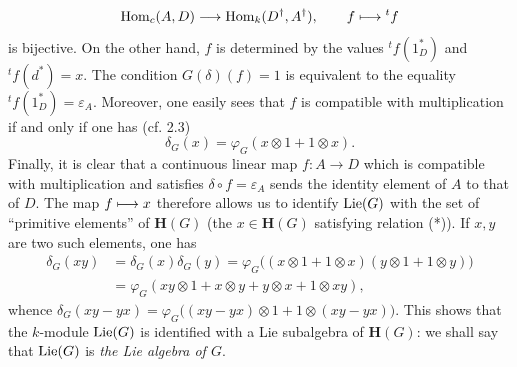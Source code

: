 \begin{enumeratea}
\[
\operatorname{Hom}_c(A,D)\longrightarrow\operatorname{Hom}_k(D^\dagger,A^\dagger),\qquad f\longmapsto{}^t f
\]
is bijective. On the other hand, $f$ is determined by the values ${}^t f(1_D^*)$ and ${}^t f(d^*)=x$. The condition $G(\delta)(f)=1$ is equivalent to the equality ${}^t f(1_D^*)=\varepsilon_A$. Moreover, one easily sees that $f$ is compatible with multiplication if and only if one has (cf. 2.3)
\begin{equation}\tag{*}
\delta_G(x)=\varphi_G(x\otimes1+1\otimes x).
\end{equation}
Finally, it is clear that a continuous linear map $f:A\to D$ which is compatible with multiplication and satisfies $\delta\circ f=\varepsilon_A$ sends the identity element of $A$ to that of $D$. The map $f\longmapsto x$ therefore allows us to identify $\operatorname{Lie}(G)$ with the set of ``primitive elements'' of $\mathbf H(G)$ (\ie the $x\in\mathbf H(G)$ satisfying relation (*)). If $x,y$ are two such elements, one has
\[
\begin{aligned}
\delta_G(xy)&=\delta_G(x)\delta_G(y)=\varphi_G\bigl((x\otimes1+1\otimes x)(y\otimes1+1\otimes y)\bigr)\\
&=\varphi_G(xy\otimes1+x\otimes y+y\otimes x+1\otimes xy),
\end{aligned}
\]
whence $\delta_G(xy-yx)=\varphi_G\bigl((xy-yx)\otimes1+1\otimes(xy-yx)\bigr)$.
This shows that the $k$-module $\operatorname{Lie}(G)$ is identified with a Lie subalgebra of $\mathbf H(G)$: we shall say that $\operatorname{Lie}(G)$ is \emph{the Lie algebra of $G$}.
\end{enumeratea}

